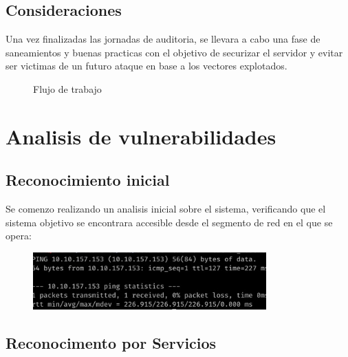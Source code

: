 \documentclass[a4paper]{article}%
\begin{document}
	\subsection{Consideraciones}
	Una vez finalizadas las jornadas de auditoria, se llevara a cabo una fase de 
	saneamientos y buenas practicas con el objetivo de securizar el servidor y evitar
	ser victimas de un futuro ataque en base a los vectores explotados. 		

	\vspace{0.5cm}

	\begin{figure}[h]
	\begin{center}
	\end{center}
	\caption{Flujo de trabajo}
	\end{figure}

	\clearpage
	\section{Analisis de vulnerabilidades}
	\subsection{Reconocimiento inicial}

	\vspace{0.2cm}
	Se comenzo realizando un analisis inicial sobre el sistema, verificando que el sistema
	objetivo se encontrara accesible desde el segmento de red en el que se opera:

	\begin{figure}[h]
	\includegraphics[width=0.8\textwidth]{images/ping_maquina.jpeg}
	\end{figure}

	\vspace{0.2cm}


	\subsection{Reconocimento por Servicios}
	
\end{document}
